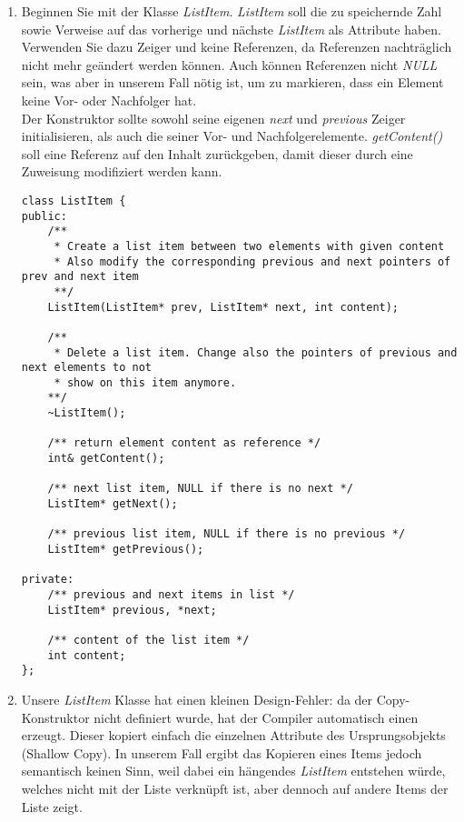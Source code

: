 \documentclass[
  accentcolor=tud1c,	%
  colorbacktitle,		%
  inverttitle,			%
  german,				%
  twoside
]{tudexercise}
\begin{document}
\begin{enumerate}
\item Beginnen Sie mit der Klasse \emph{ListItem}. \emph{ListItem} soll die zu speichernde Zahl sowie Verweise auf das vorherige und nächste \emph{ListItem} als Attribute haben. Verwenden Sie dazu Zeiger und keine Referenzen, da Referenzen nachträglich nicht mehr geändert werden können. Auch können Referenzen nicht \emph{NULL} sein, was aber in unserem Fall nötig ist, um zu markieren, dass ein Element keine Vor- oder Nachfolger hat. \\

Der Konstruktor sollte sowohl seine eigenen \emph{next} und \emph{previous} Zeiger initialisieren, als auch die seiner Vor- und Nachfolgerelemente. \emph{getContent()} soll eine Referenz auf den Inhalt zurückgeben, damit dieser durch eine Zuweisung modifiziert werden kann.

\begin{lstlisting}
class ListItem {
public:
	/** 
	 * Create a list item between two elements with given content 
	 * Also modify the corresponding previous and next pointers of prev and next item
	 **/
	ListItem(ListItem* prev, ListItem* next, int content);

	/** 
	 * Delete a list item. Change also the pointers of previous and next elements to not
	 * show on this item anymore.
	**/
	~ListItem();

	/** return element content as reference */
	int& getContent();

	/** next list item, NULL if there is no next */
	ListItem* getNext();

	/** previous list item, NULL if there is no previous */
	ListItem* getPrevious();

private:
	/** previous and next items in list */
	ListItem* previous, *next;

	/** content of the list item */
	int content;
};
\end{lstlisting}

\item Unsere \emph{ListItem} Klasse hat einen kleinen Design-Fehler: da der Copy-Konstruktor nicht definiert wurde, hat der Compiler automatisch einen erzeugt. Dieser kopiert einfach die einzelnen Attribute des Ursprungsobjekts (Shallow Copy). In unserem Fall ergibt das Kopieren eines Items jedoch semantisch keinen Sinn, weil dabei ein hängendes \emph{ListItem} entstehen würde, welches nicht mit der Liste verknüpft ist, aber dennoch auf andere Items der Liste zeigt. 


\end{enumerate}
\end{document}

